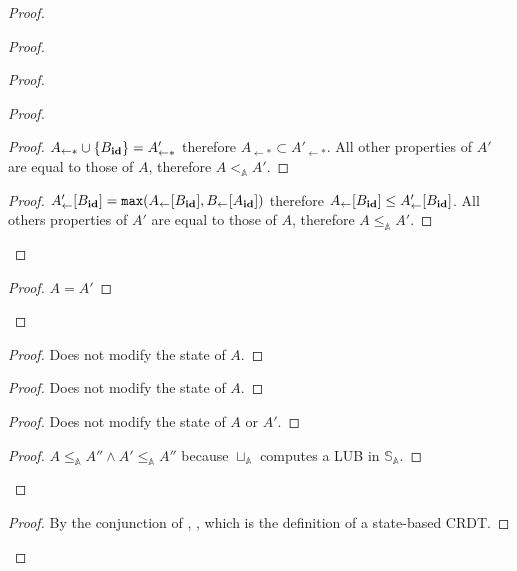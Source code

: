 \documentclass[9pt, oneside]{article}   	%
\begin{document}
\begin{proof}
\begin{proof}
		\begin{proof}
			\begin{proof}
				\begin{proof}
					$A_{\leftarrow *} \cup \{ B_{\scriptsize \textbf{id}} \} = A'_{\leftarrow *}$ therefore $A_{\leftarrow *} \subset A'_{\leftarrow *}$. All other properties of $A'$ are equal to those of $A$, therefore $A <_\mathds{A} A'$.
				\end{proof}
				
				\begin{proof}
					$A'_\leftarrow[B_{\scriptsize \textbf{id}}] = \texttt{max}(A_\leftarrow[B_{\scriptsize \textbf{id}}], B_\leftarrow[A_{\scriptsize \textbf{id}}])$ therefore $A_\leftarrow[B_{\scriptsize \textbf{id}}] \leq A'_\leftarrow[B_{\scriptsize \textbf{id}}]$. All others properties of $A'$ are equal to those of $A$, therefore $A \leq_\mathds{A} A'$.
				\end{proof} 
			\end{proof}
			
			\begin{proof}
				$A=A'$
			\end{proof}
		\end{proof}
		
		\begin{proof}
			Does not modify the state of $A$.
		\end{proof}
		
		\begin{proof}
			Does not modify the state of $A$.
		\end{proof}
		
		\begin{proof}
			Does not modify the state of $A$ or $A'$.
		\end{proof}
		
		\begin{proof}
			$A \leq_\mathds{A} A'' \wedge A' \leq_\mathds{A} A''$ because $\sqcup_\mathds{A}$ computes a LUB in $\mathds{S}_\mathds{A}$.
		\end{proof}
	\end{proof}
	
	\qedstep
	\begin{proof}
		By the conjunction of , ,  which is the definition of a state-based CRDT.
	\end{proof}
\end{proof}
\end{document}
